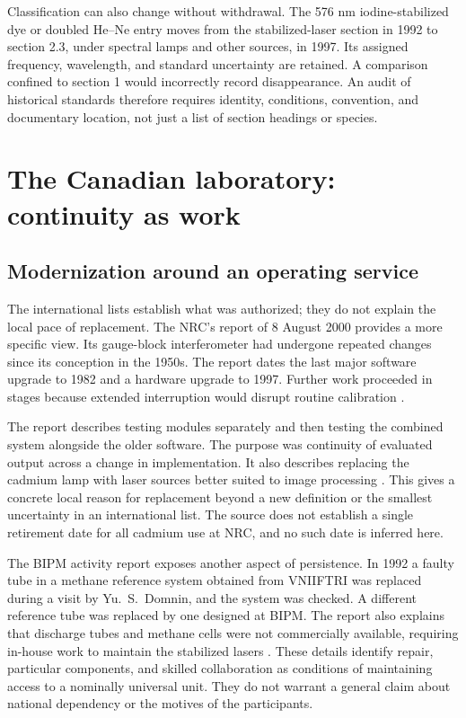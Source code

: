 \documentclass[11pt,a4paper]{article}
\begin{document}
Classification can also change without withdrawal. The 576 nm iodine-stabilized dye or doubled He--Ne entry moves from the stabilized-laser section in 1992 to section 2.3, under spectral lamps and other sources, in 1997. Its assigned frequency, wavelength, and standard uncertainty are retained. A comparison confined to section 1 would incorrectly record disappearance. An audit of historical standards therefore requires identity, conditions, convention, and documentary location, not just a list of section headings or species.

\section{The Canadian laboratory: continuity as work}
\subsection{Modernization around an operating service}
The international lists establish what was authorized; they do not explain the local pace of replacement. The NRC's report of 8 August 2000 provides a more specific view. Its gauge-block interferometer had undergone repeated changes since its conception in the 1950s. The report dates the last major software upgrade to 1982 and a hardware upgrade to 1997. Further work proceeded in stages because extended interruption would disrupt routine calibration \citep[pp.~1--3]{decker2000}.

The report describes testing modules separately and then testing the combined system alongside the older software. The purpose was continuity of evaluated output across a change in implementation. It also describes replacing the cadmium lamp with laser sources better suited to image processing \citep[pp.~3, 5]{decker2000}. This gives a concrete local reason for replacement beyond a new definition or the smallest uncertainty in an international list. The source does not establish a single retirement date for all cadmium use at NRC, and no such date is inferred here.

The BIPM activity report exposes another aspect of persistence. In 1992 a faulty tube in a methane reference system obtained from VNIIFTRI was replaced during a visit by Yu.~S.~Domnin, and the system was checked. A different reference tube was replaced by one designed at BIPM. The report also explains that discharge tubes and methane cells were not commercially available, requiring in-house work to maintain the stabilized lasers \citep[pp.~163--164; French pp.~48--49]{cipm1992}. These details identify repair, particular components, and skilled collaboration as conditions of maintaining access to a nominally universal unit. They do not warrant a general claim about national dependency or the motives of the participants.
\end{document}
